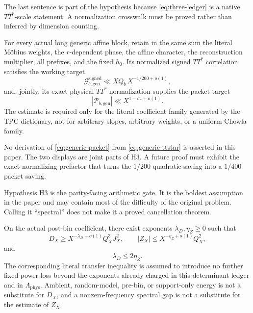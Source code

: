 The last sentence is part of the hypothesis because
\eqref{eq:three-ledger} is a native \(TT^*\)-scale statement.  A
normalization crosswalk must be proved rather than inferred by
dimension counting.

\begin{hypothesis}
\label{hyp:generic}
For every actual long generic affine block, retain in the same sum the
literal M\"obius weights, the \(r\)-dependent phase, the affine
character, the reconstruction multiplier, all prefixes, and the fixed
\(h_0\).  Its normalized signed \(TT^*\) correlation satisfies the
working target
\begin{equation}
\mathcal G_{b,\mathrm{gen}}^{\mathrm{signed}}
\ll
XQ_b\,X^{-1/200+o(1)},
\label{eq:generic-ttstar}
\end{equation}
and, jointly, its exact physical \(TT^*\) normalization supplies the
packet target
\begin{equation}
|\mathcal P_{b,\mathrm{gen}}|
\ll
X^{1-\sigma_*+o(1)}.
\label{eq:generic-packet}
\end{equation}
The estimate is required only for the literal coefficient family
generated by the TPC dictionary, not for arbitrary slopes, arbitrary
weights, or a uniform Chowla family.
\end{hypothesis}

No derivation of \eqref{eq:generic-packet} from
\eqref{eq:generic-ttstar} is asserted in this paper.  The two displays
are joint parts of H3.  A future proof must exhibit the exact
normalizing prefactor that turns the \(1/200\) quadratic saving into a
\(1/400\) packet saving.

Hypothesis H3 is the parity-facing arithmetic gate.  It is the
boldest assumption in the paper and may contain most of the difficulty
of the original problem.  Calling it ``spectral'' does not make it a
proved cancellation theorem.

\begin{hypothesis}
\label{hyp:det-zero}
On the actual post-bin coefficient, there exist exponents
\(\lambda_D,\eta_Z\ge0\) such that
\[
D_X\ge
X^{-\lambda_D+o(1)}Q_X^3J_X^2,
\qquad
|Z_X|\le
X^{-\eta_Z+o(1)}Q_X^2,
\]
and
\[
\lambda_D\le2\eta_Z.
\]
The corresponding literal transfer inequality is assumed to
introduce no further fixed-power loss beyond the exponents already
charged in this determinant ledger and in
\(\Lambda_{\mathrm{phys}}\).
Ambient, random-model, pre-bin, or support-only energy is not a
substitute for \(D_X\), and a nonzero-frequency spectral gap is not a
substitute for the estimate of \(Z_X\).
\end{hypothesis}

